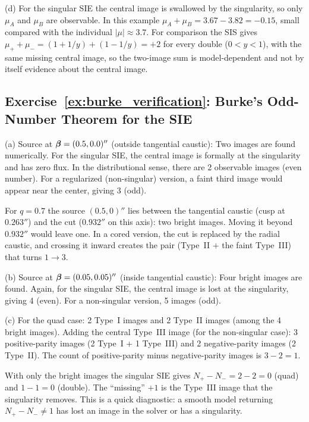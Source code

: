 (d) For the singular SIE the central image is swallowed
by the singularity, so only $\mu_A$ and $\mu_B$ are observable.  In
this example $\mu_A + \mu_B = 3.67 - 3.82 = -0.15$, small compared
with the individual $|\mu| \approx 3.7$.  For comparison the SIS
gives $\mu_+ + \mu_- = (1 + 1/y) + (1 - 1/y) = +2$ for every double
($0 < y < 1$), with the same missing central image, so the
two-image sum is model-dependent and not by itself evidence about
the central image. \checkmark



\subsection*{Exercise~\ref{ex:burke_verification}: Burke's Odd-Number Theorem for the SIE}

(a) Source at $\boldsymbol{\beta} = (0.5, 0.0)''$ (outside tangential
caustic): Two images are found numerically.  For the singular SIE,
the central image is formally at the singularity and has zero flux.
In the distributional sense, there are 2 observable images (even
number).  For a regularized (non-singular) version, a faint third
image would appear near the center, giving 3 (odd). \checkmark

\begin{annotation}
For $q = 0.7$ the source $(0.5, 0)''$ lies between the tangential caustic
(cusp at $0.263''$) and the cut ($0.932''$ on this axis): two bright images.
Moving it beyond $0.932''$ would leave one.  In a cored version, the cut is
replaced by the radial caustic, and crossing it inward creates the pair
(Type~II $+$ the faint Type~III) that turns $1 \to 3$.
\end{annotation}


(b) Source at $\boldsymbol{\beta} = (0.05, 0.05)''$ (inside tangential
caustic): Four bright images are found.  Again, for the singular SIE,
the central image is lost at the singularity, giving 4 (even).  For
a non-singular version, 5 images (odd). \checkmark

(c) For the quad case: 2 Type~I images and 2 Type~II images
(among the 4 bright images).  Adding the central Type~III image
(for the non-singular case): 3 positive-parity images (2 Type~I +
1 Type~III) and 2 negative-parity images (2 Type~II).  The count
of positive-parity minus negative-parity images is $3 - 2 = 1$.
\checkmark

\begin{annotation}
With only the bright images the singular SIE gives $N_+ - N_- = 2 - 2 = 0$
(quad) and $1 - 1 = 0$ (double).  The ``missing'' $+1$ is the
Type~III image that the singularity removes.  This is a quick diagnostic: a
smooth model returning $N_+ - N_- \neq 1$ has lost an image in the solver or
has a singularity.
\end{annotation}


